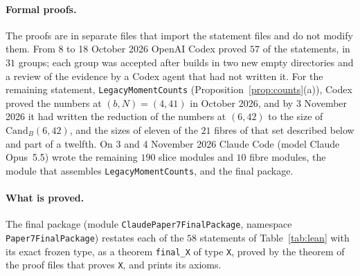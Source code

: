 \documentclass[11pt]{article}
\theoremstyle{definition}
\theoremstyle{remark}
\begin{document}
\paragraph{Formal proofs.}
The proofs are in separate files that import the statement files and do not
modify them. From 8 to 18 October 2026 OpenAI Codex proved $57$ of the
statements, in $31$ groups; each group was accepted after builds in two new
empty directories and a review of the evidence by a Codex agent that had not
written it. For the remaining statement, \texttt{LegacyMomentCounts}
(Proposition~\ref{prop:counts}(a)), Codex proved the numbers at $(b,N)=(4,41)$
in October 2026, and by 3 November 2026 it had written the reduction of the
numbers at $(6,42)$ to the size of $\mathrm{Cand}_B(6,42)$, and the sizes of
eleven of the $21$ fibres of that set described below and part of a
twelfth. On 3 and 4 November 2026 Claude
Code (model Claude Opus~5.5) wrote the remaining $190$ slice modules and $10$
fibre modules, the module that assembles \texttt{LegacyMomentCounts}, and the
final package.

\paragraph{What is proved.}
The final package (module \texttt{ClaudePaper7FinalPackage}, namespace
\texttt{Paper7FinalPackage}) restates each of the $58$ statements of
Table~\ref{tab:lean} with its exact frozen type, as a theorem
\texttt{final\_X} of type \texttt{X}, proved by the theorem of the proof
files that proves \texttt{X}, and prints its axioms.
\end{document}
